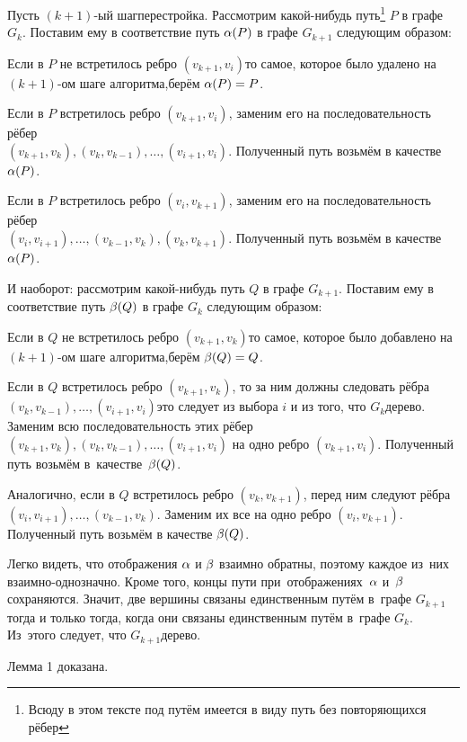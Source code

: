 \documentclass[a4paper,12pt]{article}
\begin{document}
Пусть $(k+1)$-ый шаг\т перестройка. Рассмотрим какой-нибудь путь\footnote{Всюду в этом тексте под путём имеется в виду путь без повторяющихся рёбер} $P$ в графе $G_k$. Поставим ему в соответствие путь $\alpha(P)$ в графе $G_{k+1}$ следующим образом:
\begin{items}{-3}
\item
Если в $P$ не встретилось ребро $(v_{k+1}, v_i)$\т то самое, которое было удалено на $(k+1)$-ом шаге алгоритма,\т берём $\alpha(P) = P$.
\item
Если в $P$ встретилось ребро $(v_{k+1}, v_i)$, заменим его на последовательность рёбер\\
$(v_{k+1}, v_k), (v_k, v_{k-1}), \ldots, (v_{i+1}, v_i)$. Полученный путь возьмём в качестве $\alpha(P)$.
\item
Если в $P$ встретилось ребро $(v_i, v_{k+1})$, заменим его на последовательность рёбер\\
$(v_i, v_{i+1}), \ldots, (v_{k-1}, v_k), (v_k, v_{k+1})$. Полученный путь возьмём в качестве $\alpha(P)$.
\end{items}
И наоборот: рассмотрим какой-нибудь путь $Q$ в графе $G_{k+1}$. Поставим ему в соответствие путь $\beta(Q)$ в графе $G_k$ следующим образом:
\begin{items}{-3}
\item
Если в $Q$ не встретилось ребро $(v_{k+1}, v_k)$\т то самое, которое было добавлено на $(k+1)$-ом шаге алгоритма,\т берём $\beta(Q) = Q$.
\item
Если в $Q$ встретилось ребро $(v_{k+1}, v_k)$, то за ним должны следовать рёбра $(v_k, v_{k-1}), \ldots, (v_{i+1}, v_i)$\т это следует из выбора $i$ и из того, что $G_k$\т дерево. Заменим всю последовательность этих рёбер $(v_{k+1}, v_k), (v_k, v_{k-1}), \ldots, (v_{i+1}, v_i)$ на одно ребро $(v_{k+1}, v_i)$. Полученный путь возьмём в~качестве~$\beta(Q)$.
\item
Аналогично, если в $Q$ встретилось ребро $(v_k, v_{k+1})$, перед ним следуют рёбра $(v_i, v_{i+1}), \ldots, (v_{k-1}, v_k)$. Заменим их все на одно ребро $(v_i, v_{k+1})$. Полученный путь возьмём в качестве $\beta(Q)$.
\end{items}
Легко видеть, что отображения $\alpha$ и $\beta$ взаимно обратны, поэтому каждое из~них взаимно-однозначно. Кроме того, концы пути при~отображениях~$\alpha$ и~$\beta$ сохраняются. Значит, две вершины связаны единственным путём в~графе $G_{k+1}$ тогда и только тогда, когда они связаны единственным путём в~графе $G_k$. Из~этого следует, что $G_{k+1}$\т дерево.

Лемма 1 доказана.
\end{document}
